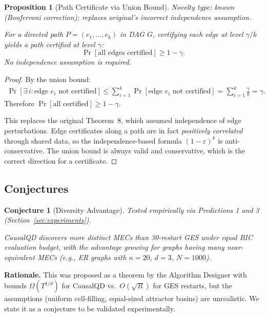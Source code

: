 \documentclass{article}
\theoremstyle{definition}
\theoremstyle{plain}
\newtheorem{proposition}{Proposition}
\newtheorem{conjecture}{Conjecture}
\theoremstyle{remark}
\begin{document}
\begin{proposition}[Path Certificate via Union Bound]
\label{prop:path}
\emph{Novelty type: known (Bonferroni correction); replaces original's incorrect
independence assumption.}

For a directed path $P = (e_1, \ldots, e_k)$ in DAG $G$, certifying each edge
at level $\gamma/k$ yields a path certified at level $\gamma$:
\begin{equation}
  \Pr[\text{all edges certified}] \geq 1 - \gamma.
\end{equation}
No independence assumption is required.
\end{proposition}

\begin{proof}
By the union bound:
\begin{align}
  \Pr[\exists\, i: \text{edge } e_i \text{ not certified}]
  &\leq \sum_{i=1}^k \Pr[\text{edge } e_i \text{ not certified}]
  = \sum_{i=1}^k \frac{\gamma}{k} = \gamma.
\end{align}
Therefore $\Pr[\text{all certified}] \geq 1 - \gamma$.

This replaces the original Theorem~8, which assumed independence of edge
perturbations. Edge certificates along a path are in fact \emph{positively
correlated} through shared data, so the independence-based formula
$(1-\varepsilon)^k$ is anti-conservative. The union bound is always valid and
conservative, which is the correct direction for a certificate.
\end{proof}


\subsection{Conjectures}

\begin{conjecture}[Diversity Advantage]
\label{conj:diversity}
\emph{Tested empirically via Predictions 1 and 3 (Section~\ref{sec:experiments}).}

CausalQD discovers more distinct MECs than 30-restart GES under equal BIC
evaluation budget, with the advantage growing for graphs having many
near-equivalent MECs (e.g., ER graphs with $n = 20$, $d = 3$, $N = 1000$).
\end{conjecture}

\textbf{Rationale.} This was proposed as a theorem by the Algorithm Designer
with bounds $\Omega(T^{1/d})$ for CausalQD vs.\ $O(\sqrt{R})$ for GES restarts,
but the assumptions (uniform cell-filling, equal-sized attractor basins) are
unrealistic. We state it as a conjecture to be validated experimentally.
\end{document}
